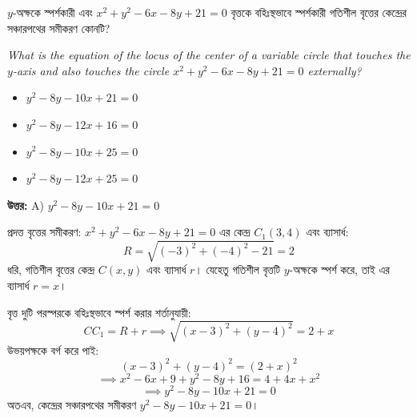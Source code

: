 \documentclass[12pt, a4paper]{article}
\begin{document}
\begin{tcolorbox}[questionbox={প্রশ্ন (Question) 33}]
    \noindent
    $y$-অক্ষকে স্পর্শকারী এবং $x^2 + y^2 - 6x - 8y + 21 = 0$ বৃত্তকে বহিঃস্থভাবে স্পর্শকারী গতিশীল বৃত্তের কেন্দ্রের সঞ্চারপথের সমীকরণ কোনটি?
    
    \vspace{0.8em}
    \begin{english}
    \noindent\textit{\color{darkgray}
    What is the equation of the locus of the center of a variable circle that touches the $y$-axis and also touches the circle $x^2 + y^2 - 6x - 8y + 21 = 0$ externally?
    }
    \end{english}
\end{tcolorbox}

\begin{itemize}[label={}, leftmargin=1cm, itemsep=0.5em]
    \item[\textbf{A)}] $y^2 - 8y - 10x + 21 = 0$
    \item[\textbf{B)}] $y^2 - 8y - 12x + 16 = 0$
    \item[\textbf{C)}] $y^2 - 8y - 10x + 25 = 0$
    \item[\textbf{D)}] $y^2 - 8y - 12x + 25 = 0$
\end{itemize}

\vspace{0.5em}
\begin{tcolorbox}[answerbox]
    \textbf{\color{success} উত্তর:} A) $y^2 - 8y - 10x + 21 = 0$
\end{tcolorbox}
\vspace{1em}

\begin{tcolorbox}[solutionbox={সমাধান (Solution)}]
    \noindent
    প্রদত্ত বৃত্তের সমীকরণ: $x^2 + y^2 - 6x - 8y + 21 = 0$ এর কেন্দ্র $C_1(3, 4)$ এবং ব্যাসার্ধ:
    \[ R = \sqrt{(-3)^2 + (-4)^2 - 21} = 2 \]
    ধরি, গতিশীল বৃত্তের কেন্দ্র $C(x, y)$ এবং ব্যাসার্ধ $r$। যেহেতু গতিশীল বৃত্তটি $y$-অক্ষকে স্পর্শ করে, তাই এর ব্যাসার্ধ $r = x$। 
    
    \vspace{0.5em}
    বৃত্ত দুটি পরস্পরকে বহিঃস্থভাবে স্পর্শ করার শর্তানুযায়ী:
    \[ CC_1 = R + r \implies \sqrt{(x - 3)^2 + (y - 4)^2} = 2 + x \]
    উভয়পক্ষকে বর্গ করে পাই:
    \[ (x - 3)^2 + (y - 4)^2 = (2 + x)^2 \]
    \[ \implies x^2 - 6x + 9 + y^2 - 8y + 16 = 4 + 4x + x^2 \]
    \[ \implies y^2 - 8y - 10x + 21 = 0 \]
    অতএব, কেন্দ্রের সঞ্চারপথের সমীকরণ $y^2 - 8y - 10x + 21 = 0$।
\end{tcolorbox}
\end{document}
